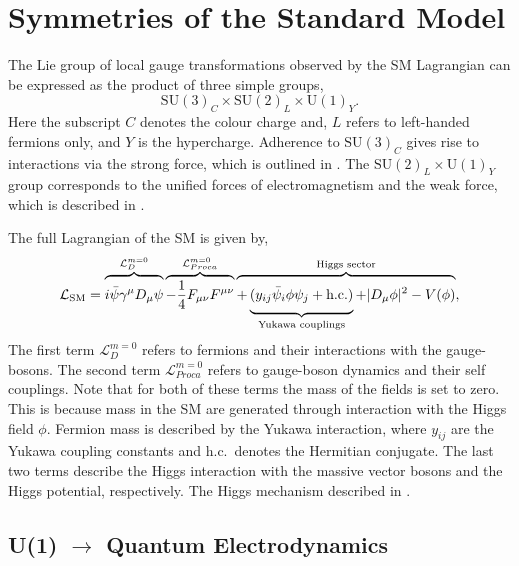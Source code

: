\section{Symmetries of the Standard Model}
\label{sec:symmetries_of_sm}

The Lie group of local gauge transformations observed by the SM Lagrangian can be expressed as the product of three simple groups,
\begin{equation}
	\label{eq:sm_group}
	\text{SU}(3)_C \times \text{SU}(2)_L \times \text{U}(1)_Y.
\end{equation}
Here the subscript $C$ denotes the colour charge and, $L$ refers to left-handed fermions only, and $Y$ is the hypercharge.
Adherence to $\text{SU}(3)_C$ gives rise to interactions via the strong force, which is outlined in .
The $\text{SU}(2)_L \times \text{U}(1)_Y$ group corresponds to the unified forces of electromagnetism and the weak force, which is described in .

The full Lagrangian of the SM is given by,
\begin{equation}
	\label{eq:sm_lagrangian}
	\mathcal{L}_\text{SM} =
	\overbrace{
		\vphantom{\frac{1}{4}}
		i \bar \psi \gamma^\mu D_\mu \psi
	}^{\mathcal{L}_{D}^{m=0}
	}
	\overbrace{
		-\frac{1}{4} F_{\mu\nu} F^{\mu\nu}
	}^{\mathcal{L}_{Proca}^{m=0}
	}
	\overbrace{
		+
		\underbrace{
			\vphantom{\frac{1}{4}}
			(y_{ij} \bar \psi_i \phi \psi_j
			+ \text{h.c.})
		}_{\text{Yukawa couplings}}
		+ |D_\mu \phi|^2
		- V(\phi)
	}^{\text{Higgs sector}},
\end{equation}
The first term $\mathcal{L}_D^{m=0}$ refers to fermions and their interactions with the gauge-bosons.
The second term $\mathcal{L}_{Proca}^{m=0}$ refers to gauge-boson dynamics and their self couplings.
Note that for both of these terms the mass of the fields is set to zero.
This is because mass in the SM are generated through interaction with the Higgs field $\phi$.
Fermion mass is described by the Yukawa interaction, where $y_{ij}$ are the Yukawa coupling constants and h.c.\ denotes the Hermitian conjugate.
The last two terms describe the Higgs interaction with the massive vector bosons and the Higgs potential, respectively.
The Higgs mechanism described in .

\subsection{U(1) \texorpdfstring{$\rightarrow$}{-} Quantum Electrodynamics}

